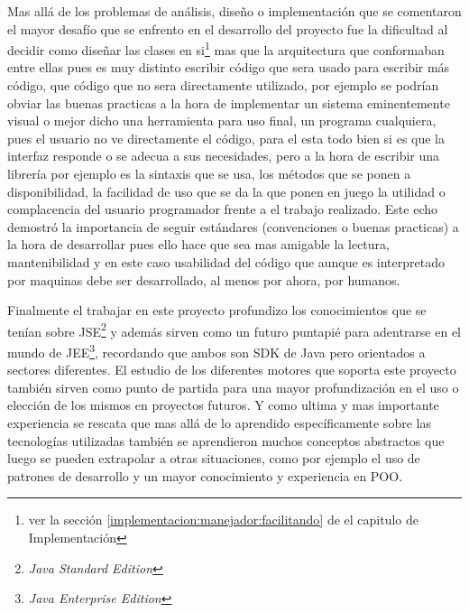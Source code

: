 Mas allá de los problemas de análisis, diseño o implementación que se comentaron
el mayor desafío que se enfrento en el desarrollo del proyecto fue la dificultad al decidir como diseñar las clases en si\footnote{ver la sección \ref{implementacion:manejador:facilitando} de el capitulo de Implementación} mas que la arquitectura que conformaban entre ellas pues es muy distinto escribir código que sera usado para escribir más código, que código que no sera directamente utilizado, por ejemplo se podrían obviar las buenas practicas a la hora de implementar un sistema eminentemente visual o mejor dicho una herramienta para uso final, un programa cualquiera, pues el usuario no ve directamente el código, para el esta todo bien si es que la interfaz responde o se adecua a sus necesidades, pero a la hora de escribir una librería por ejemplo es la sintaxis que se usa, los métodos que se ponen a disponibilidad, la facilidad de uso que se da la que ponen en juego la utilidad o complacencia del usuario programador frente a el trabajo realizado. Este echo demostró la importancia de seguir estándares (convenciones o buenas practicas) a la hora de desarrollar pues ello hace que sea mas amigable la lectura, mantenibilidad y en este caso usabilidad del código que aunque es interpretado por maquinas debe ser desarrollado, al menos por ahora, por humanos.

Finalmente el trabajar en este proyecto profundizo los conocimientos que se tenían sobre JSE\footnote{\textit{Java Standard Edition}} y además sirven como un futuro puntapié para adentrarse en el mundo de JEE\footnote{\textit{Java Enterprise Edition}}, recordando que ambos son SDK de Java pero orientados a sectores diferentes. El estudio de los diferentes motores que soporta este proyecto también sirven como punto de partida para una mayor profundización en el uso o elección de los mismos en proyectos futuros. Y como ultima y mas importante experiencia se rescata que mas allá de lo aprendido específicamente sobre las tecnologías utilizadas también se aprendieron muchos conceptos abstractos que luego se pueden extrapolar a otras situaciones, como por ejemplo el uso de patrones de desarrollo y un mayor conocimiento y experiencia en POO.